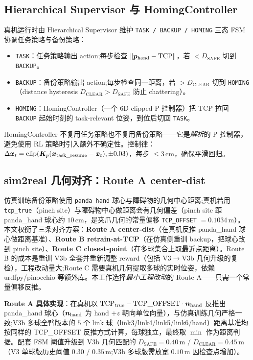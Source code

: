 \subsection{Hierarchical Supervisor 与 HomingController}\label{subsec:supervisor}

真机运行时由 Hierarchical Supervisor 维护 \texttt{TASK / BACKUP / HOMING} 三态 FSM 协调任务策略与备份策略：

\begin{itemize}
  \item \texttt{TASK}：任务策略输出 action;每步检查 $\lVert \bm{p}_\text{hand} - \text{TCP}\rVert$，若 $< D_\text{SAFE}$ 切到 \texttt{BACKUP}。
  \item \texttt{BACKUP}：备份策略输出 action;每步检查同一距离，若 $> D_\text{CLEAR}$ 切到 \texttt{HOMING}（distance hysteresis $D_\text{CLEAR} > D_\text{SAFE}$ 防止 chattering）。
  \item \texttt{HOMING}：HomingController（一个 6D clipped-P 控制器）把 TCP 拉回 \texttt{BACKUP} 起始时刻的 task-relevant 位姿，到位后切回 \texttt{TASK}。
\end{itemize}

HomingController 不复用任务策略也不复用备份策略——它是\emph{解析}的 P 控制器，避免使用 RL 策略时引入额外不确定性。控制律：$\Delta\bm{x}_t = \mathrm{clip}(\bm{K}_p (\bm{x}_\text{task\_resume} - \bm{x}_t), \pm 0.03)$，每步 $\leq 3$\,cm，确保平滑回归。

\subsection{sim2real 几何对齐：Route A center-dist}\label{subsec:route_a}

仿真训练备份策略使用 \texttt{panda\_hand} 球心与障碍物的几何中心距离;真机若用 \texttt{tcp\_true}（pinch site）与障碍物中心做距离会有几何偏差（pinch site 距 panda\_hand 球心约 $10$\,cm，是夹爪几何的常量偏移 \texttt{TCP\_OFFSET} $= 0.1034$\,m）。本文权衡了三条对齐方案：\textbf{Route A center-dist}（在真机反推 panda\_hand 球心做距离基准）、\textbf{Route B retrain-at-TCP}（在仿真侧重训 backup，把球心改到 pinch site）、\textbf{Route C closest-point}（在多球集合上取最近点距离）。Route B 的成本是重训 V3b 全套并重新调整 reward（包括 V3$\to$V3b 几何升级的复检），工程改动量大;Route C 需要真机几何提取多球的实时位姿，依赖 urdfpy/pinocchio 等额外库。本工作选择\emph{最小工程改动}的 Route A——只需一个常量偏移反推。

\textbf{Route A 具体实现}：在真机以 $\text{TCP}_\text{true} - \text{TCP\_OFFSET} \cdot \bm{n}_\text{hand}$ 反推出 panda\_hand 球心（$\bm{n}_\text{hand}$ 为 hand $+z$ 朝向单位向量），与仿真训练几何严格一致;V3b 多球全臂版本的 $5$ 个 link 球（link3/link4/link5/link6/hand）距离基准均按同样的 TCP\_OFFSET 反推方式计算，每球独立，最终取 $\min$ 作为距离判据。配套 FSM 阈值升级到 V3b 几何匹配的 $D_\text{SAFE} = 0.40$\,m / $D_\text{CLEAR} = 0.45$\,m（V3 单球版历史阈值 $0.30$ / $0.35$\,m;V3b 多球版需放宽 $0.10$\,m 因检查点增加）。

